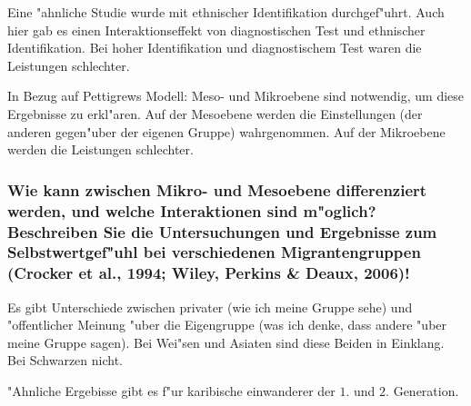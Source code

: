 Eine "ahnliche Studie wurde mit ethnischer Identifikation durchgef"uhrt. Auch hier gab es einen Interaktionseffekt von diagnostischen Test und ethnischer Identifikation. Bei hoher Identifikation und diagnostischem Test waren die Leistungen schlechter.

In Bezug auf Pettigrews Modell: Meso- und Mikroebene sind notwendig, um diese Ergebnisse zu erkl"aren. Auf der Mesoebene werden die Einstellungen (der anderen gegen"uber der eigenen Gruppe) wahrgenommen. Auf der Mikroebene werden die Leistungen schlechter.

\subsubsection{Wie kann zwischen Mikro- und Mesoebene differenziert werden, und welche Interaktionen sind m"oglich? Beschreiben Sie die Untersuchungen und Ergebnisse zum Selbstwertgef"uhl bei verschiedenen Migrantengruppen (Crocker et al., 1994; Wiley, Perkins \& Deaux, 2006)!}
Es gibt Unterschiede zwischen privater (wie ich meine Gruppe sehe) und "offentlicher Meinung "uber die Eigengruppe (was ich denke, dass andere "uber meine Gruppe sagen). Bei Wei"sen und Asiaten sind diese Beiden in Einklang. Bei Schwarzen nicht.

"Ahnliche Ergebisse gibt es f"ur karibische einwanderer der $1.$ und $2.$ Generation.

